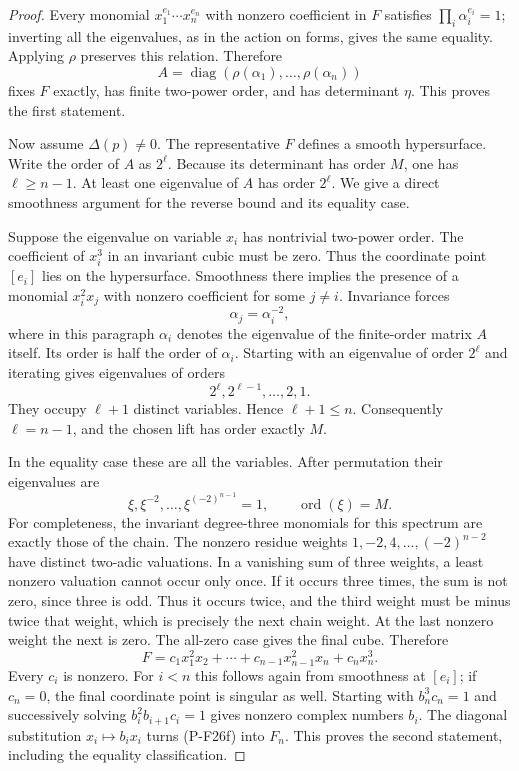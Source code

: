 \begin{proof}
Every monomial $x_1^{e_1}\cdots x_n^{e_n}$ with nonzero
coefficient in $F$ satisfies $\prod_i\alpha_i^{e_i}=1$;
inverting all the eigenvalues, as in the action on forms,
gives the same equality. Applying $\rho$ preserves this
relation. Therefore
\[
 A=\operatorname{diag}(\rho(\alpha_1),\ldots,
                       \rho(\alpha_n))
 \tag{P-F26c}
\]
fixes $F$ exactly, has finite two-power order, and has
determinant $\eta$. This proves the first statement.

Now assume $\Delta(p)\ne0$. The representative $F$ defines
a smooth hypersurface. Write the order of $A$ as $2^\ell$.
Because its determinant has order $M$, one has $\ell\ge n-1$.
At least one eigenvalue of $A$ has order $2^\ell$.
We give a direct smoothness argument for the reverse bound
and its equality case.

Suppose the eigenvalue on variable $x_i$ has nontrivial
two-power order. The coefficient of $x_i^3$ in an invariant
cubic must be zero. Thus the coordinate point $[e_i]$ lies
on the hypersurface. Smoothness there implies the presence
of a monomial $x_i^2x_j$ with nonzero coefficient for some
$j\ne i$. Invariance forces
\[
 \alpha_j=\alpha_i^{-2},
 \tag{P-F26d}
\]
where in this paragraph $\alpha_i$ denotes the eigenvalue
of the finite-order matrix $A$ itself. Its order is half
the order of $\alpha_i$. Starting with an eigenvalue of
order $2^\ell$ and iterating gives eigenvalues of orders
\[
 2^\ell,2^{\ell-1},\ldots,2,1.
\]
They occupy $\ell+1$ distinct variables. Hence $\ell+1\le n$.
Consequently $\ell=n-1$, and the chosen lift has order
exactly $M$.

In the equality case these are all the variables. After
permutation their eigenvalues are
\[
 \xi,\xi^{-2},\ldots,\xi^{(-2)^{n-1}}=1,
 \qquad \operatorname{ord}(\xi)=M.
 \tag{P-F26e}
\]
For completeness, the invariant degree-three monomials for
this spectrum are exactly those of the chain. The nonzero
residue weights $1,-2,4,\ldots,(-2)^{n-2}$ have distinct
two-adic valuations. In a vanishing sum of three weights,
a least nonzero valuation cannot occur only once. If it
occurs three times, the sum is not zero, since three is odd.
Thus it occurs twice, and the third weight must be minus
twice that weight, which is precisely the next chain weight.
At the last nonzero weight the next is zero. The all-zero
case gives the final cube. Therefore
\[
 F=c_1x_1^2x_2+\cdots+c_{n-1}x_{n-1}^2x_n+c_nx_n^3.
 \tag{P-F26f}
\]
Every $c_i$ is nonzero. For $i<n$ this follows again from
smoothness at $[e_i]$; if $c_n=0$, the final coordinate
point is singular as well. Starting with $b_n^3c_n=1$
and successively solving $b_i^2b_{i+1}c_i=1$ gives nonzero
complex numbers $b_i$. The diagonal substitution
$x_i\mapsto b_ix_i$ turns (P-F26f) into $F_n$. This proves
the second statement, including the equality classification.


\end{proof}
